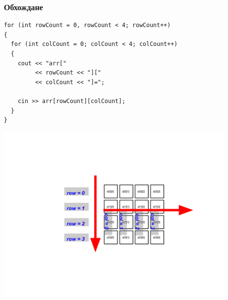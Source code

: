 \documentclass{beamer}
\begin{document}
\begin{frame}[fragile]
\frametitle{Обхождане}

\begin{flushleft}

\begin{lstlisting}
for (int rowCount = 0, rowCount < 4; rowCount++)
{
  for (int colCount = 0; colCount < 4; colCount++)
  {
    cout << "arr["
         << rowCount << "]["
         << colCount << "]="; 
    
    cin >> arr[rowCount][colCount];
  }
}
\end{lstlisting}
\end{flushleft}

\vspace*{-100pt}
\hspace*{-40pt}
\includegraphics[width=12cm]{images/matr_iter_1} 

\end{frame}
\end{document}
